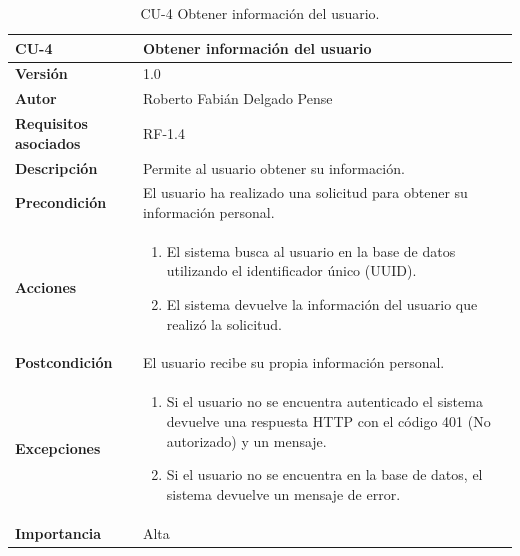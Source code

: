 \begin{table}[p]
	\centering
	\begin{tabularx}{\linewidth}{ p{} p{} }
		\toprule
		\textbf{CU-4}    & \textbf{Obtener información del usuario}\\
		\toprule
		\textbf{Versión}              & 1.0    \\
		\textbf{Autor}                & Roberto Fabián Delgado Pense \\
		\textbf{Requisitos asociados} & RF-1.4 \\ 
		\textbf{Descripción}          & Permite al usuario obtener su información. \\
		\textbf{Precondición}         & El usuario ha realizado una solicitud para obtener su información personal. \\
		\textbf{Acciones}             &
		\begin{enumerate}
			\def\labelenumi{\arabic{enumi}.}
			\tightlist
			\item El sistema busca al usuario en la base de datos utilizando el identificador único (UUID).
			\item El sistema devuelve la información del usuario que realizó la solicitud.
            \end{enumerate}\\
		\textbf{Postcondición}        & El usuario recibe su propia información personal.\\
		\textbf{Excepciones}          & 
                \begin{enumerate}
			\def\labelenumi{\arabic{enumi}.}
			\tightlist
			\item Si el usuario no se encuentra autenticado el sistema devuelve una respuesta HTTP con el código 401 (No autorizado) y un mensaje.
                \item   Si el usuario no se encuentra en la base de datos, el sistema devuelve un                                            mensaje de error. 
            \end{enumerate}\\
		\textbf{Importancia}          & Alta \\
		\bottomrule
	\end{tabularx}
	\caption{CU-4 Obtener información del usuario.}
\end{table}


